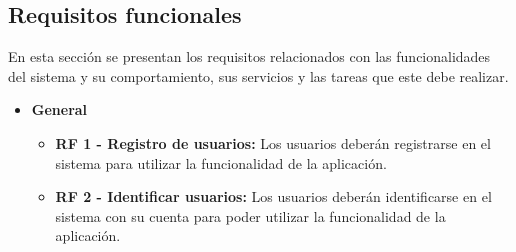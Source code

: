 \subsection{Requisitos funcionales}
En esta sección se presentan los requisitos relacionados con las funcionalidades del sistema y su comportamiento, sus servicios y las tareas que este debe realizar.

\begin{itemize}
    \item \textbf{General}
          \begin{itemize}
              \item \textbf{RF 1 - Registro de usuarios: }Los usuarios deberán registrarse en el sistema para utilizar la funcionalidad de la aplicación.
              \item \textbf{RF 2 - Identificar usuarios: }Los usuarios deberán identificarse en el sistema con su cuenta para poder utilizar la funcionalidad de la aplicación.


\end{itemize}
\end{itemize}
